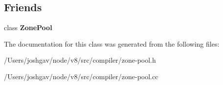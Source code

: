\subsection*{Friends}
\begin{DoxyCompactItemize}
\item 
class {\bfseries Zone\+Pool}\hypertarget{classv8_1_1internal_1_1compiler_1_1_zone_pool_1_1_stats_scope_aec16737240a3e7ddd418cfc18ee58d6e}{}\label{classv8_1_1internal_1_1compiler_1_1_zone_pool_1_1_stats_scope_aec16737240a3e7ddd418cfc18ee58d6e}

\end{DoxyCompactItemize}


The documentation for this class was generated from the following files\+:\begin{DoxyCompactItemize}
\item 
/\+Users/joshgav/node/v8/src/compiler/zone-\/pool.\+h\item 
/\+Users/joshgav/node/v8/src/compiler/zone-\/pool.\+cc\end{DoxyCompactItemize}
